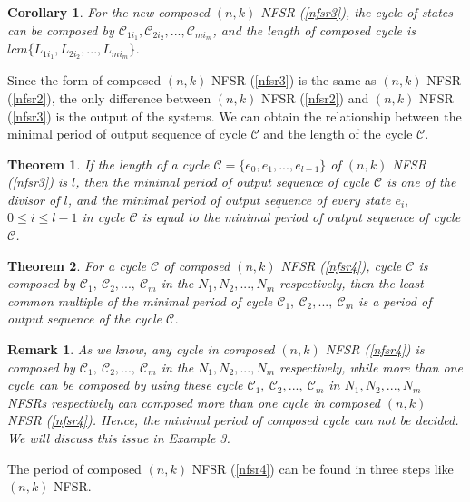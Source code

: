 \documentclass[conference]{IEEEtran}
\newtheorem{theorem}{Theorem}
\newtheorem{corollary}{Corollary}
\newtheorem{remark}{Remark}
\begin{document}
\begin{corollary}
For the new composed $(n,k)$ NFSR (\ref{nfsr3}), the cycle of states can be composed by $\mathcal{C}_{1i_1},\mathcal{C}_{2i_2},...,\mathcal{C}_{mi_m}$, and the length of composed cycle is $lcm\{L_{1i_1},L_{2i_2},...,L_{mi_m}\}$.
\end{corollary}

Since the form of composed $(n,k)$ NFSR (\ref{nfsr3}) is the same as $(n,k)$ NFSR (\ref{nfsr2}), the only difference between $(n,k)$ NFSR (\ref{nfsr2}) and $(n,k)$ NFSR (\ref{nfsr3}) is the output of the systems. We can obtain the relationship between the minimal period of output sequence of cycle $\mathcal{C}$ and the length of the cycle $\mathcal{C}$.

\begin{theorem}\label{th3}
If the length of a cycle $\mathcal{C}=\{e_0,e_1,...,e_{l-1}\}$ of $(n,k)$ NFSR (\ref{nfsr3}) is $l$, then the minimal period of output sequence of cycle $\mathcal{C}$ is one of the divisor of $l$, and the minimal period of output sequence of every state $e_i,$ $0\leq i\leq l-1$ in cycle $\mathcal{C}$ is equal to the minimal period of output sequence of cycle $\mathcal{C}$.
\end{theorem}

\begin{theorem}\label{th4}
For a cycle $\mathcal{C}$ of composed $(n,k)$ NFSR (\ref{nfsr4}), cycle $\mathcal{C}$ is composed by $\mathcal{C}_1,~\mathcal{C}_2,...,~\mathcal{C}_m$ in the $N_1,N_2,...,N_m$ respectively, then the least common multiple of the minimal period of cycle $\mathcal{C}_1,~\mathcal{C}_2,...,~\mathcal{C}_m$ is a period of output sequence of the cycle $\mathcal{C}$.
\end{theorem}

\begin{remark}
As we know, any cycle in composed $(n,k)$ NFSR (\ref{nfsr4}) is composed by $\mathcal{C}_1,~\mathcal{C}_2,...,~\mathcal{C}_m$ in the $N_1,N_2,...,N_m$ respectively, while more than one cycle can be composed by using these cycle $\mathcal{C}_1,~\mathcal{C}_2,...,~\mathcal{C}_m$ in $N_1,N_2,...,N_m$ NFSRs respectively can composed more than one cycle in composed $(n,k)$ NFSR (\ref{nfsr4}).
Hence, the minimal period of composed cycle can not be decided. We will discuss this issue in Example 3.
\end{remark}
The period of composed $(n,k)$ NFSR (\ref{nfsr4}) can be found in three steps like $(n,k)$ NFSR.
\end{document}
